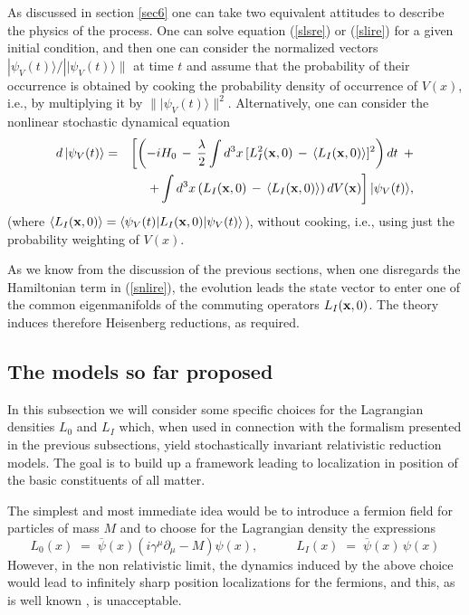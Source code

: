 \documentclass[12pt]{article}
\begin{document}
As discussed in section \ref{sec6} one can take two equivalent
attitudes to describe the physics of the process. One can solve
equation (\ref{slsre}) or (\ref{slire}) for a given initial
condition, and then one can consider the normalized vectors
$|\psi_{V}(t)\rangle/||\psi_{V}(t)\rangle\|$ at time $t$ and
assume that the probability of their occurrence is obtained by
cooking the probability density of occurrence of $V(x)$, i.e., by
multiplying it by $\||\psi_{V}(t)\rangle\|^{2}$. Alternatively,
one can consider the nonlinear stochastic dynamical equation
\begin{eqnarray} \label{snlire}
d\,|\psi_{V}(t)\rangle & = & \left[\left( -i H_{0}\, - \,
\frac{\lambda}{2}\int d^{3}x\, [L_{I}^{2}({\bf x}, 0) \, - \,
\langle L_{I}({\bf x}, 0) \rangle]^{2} \right) dt \right.
\, + \nonumber \\
& & \left. + \int d^{3}x \left( L_{I}({\bf x}, 0) \, - \, \langle
L_{I}({\bf x}, 0) \rangle \right) dV({\bf x}) \right]
|\psi_{V}(t)\rangle,
\end{eqnarray}
(where $\langle L_{I}({\bf x}, 0) \rangle = \langle\psi_{V}(t)|
L_{I}({\bf x}, 0) |\psi_{V}(t)\rangle$), without cooking, i.e.,
using just the probability weighting of $V(x)$.

As we know from the discussion of the previous sections, when one
disregards the Hamiltonian term in (\ref{snlire}), the evolution
leads the state vector to enter one of the common eigenmanifolds
of the commuting operators $L_{I}({\bf x}, 0)$. The theory induces
therefore Heisenberg reductions, as required.


\subsection{The models so far proposed} \label{sec96}

In this subsection we will consider some specific choices for the
Lagrangian densities $L_{0}$ and $L_{I}$ which, when used in
connection with the formalism presented in the previous
subsections, yield stochastically invariant relativistic reduction
models. The goal is to build up a framework leading to
localization in position of the basic constituents of all matter.

The simplest and most immediate idea would be to introduce a
fermion field for particles of mass $M$ and to choose for the
Lagrangian density the expressions
\begin{equation}
L_{0}(x) \; = \; \overline{\psi}(x)\left(
i\gamma^{\mu}\partial_{\mu} - M\right)\psi(x), \qquad\quad
L_{I}(x) \; = \; \overline{\psi}(x)\,\psi(x)
\end{equation}
However, in the non relativistic limit, the dynamics induced by
the above choice would lead to infinitely sharp position
localizations for the fermions, and this, as is well known
\cite{gr62}, is unacceptable.
\end{document}

